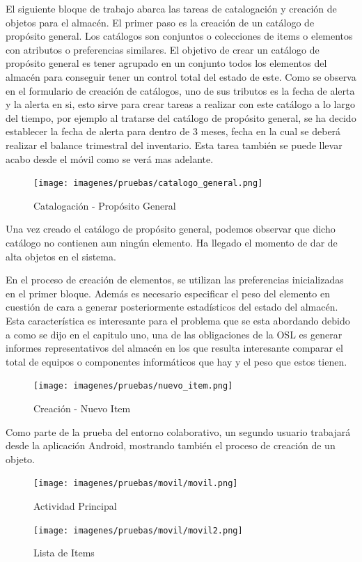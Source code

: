 \documentclass[a4paper,11pt]{book}
\begin{document}
El siguiente bloque de trabajo abarca las tareas de catalogación y creación de objetos para el almacén. El primer paso es la creación de un catálogo de propósito general. Los catálogos son conjuntos o colecciones de items o elementos con atributos o preferencias similares. El objetivo de crear un catálogo de propósito general es tener agrupado en un conjunto todos los elementos del almacén para conseguir tener un control total del estado de este. Como se observa en el formulario de creación de catálogos, uno de sus tributos es la fecha de alerta y la alerta en si, esto sirve para crear tareas a realizar con este catálogo a lo largo del tiempo, por ejemplo al tratarse del catálogo de propósito general, se ha decido establecer la fecha de alerta para dentro de 3 meses, fecha en la cual se deberá realizar el balance trimestral del inventario. Esta tarea también se puede llevar acabo desde el móvil como se verá mas adelante. 

\begin{figure}[H] 
\centering 
\texttt{[image: imagenes/pruebas/catalogo\_general.png]}
\caption{ Catalogación - Propósito General}
\end{figure}

Una vez creado el catálogo de propósito general, podemos observar que dicho catálogo no contienen aun ningún elemento. Ha llegado el momento de dar de alta objetos en el sistema. 

En el proceso de creación de elementos, se utilizan las preferencias inicializadas en el primer bloque. Además es necesario especificar el peso del elemento en cuestión de cara a generar posteriormente estadísticos del estado del almacén. Esta característica es interesante para el problema que se esta abordando debido a como se dijo en el capitulo uno, una de las obligaciones de la OSL es generar informes representativos del almacén en los que resulta interesante comparar el total de equipos o componentes informáticos que hay y el peso que estos tienen. 
\begin{figure}[H] 
\centering 
\texttt{[image: imagenes/pruebas/nuevo\_item.png]}
\caption{ Creación - Nuevo Item}
\end{figure}

Como parte de la prueba del entorno colaborativo, un segundo usuario trabajará desde la aplicación Android, mostrando también el proceso de creación de un objeto. 



\begin{figure}[H]
  \texttt{[image: imagenes/pruebas/movil/movil.png]}
  \caption{Actividad Principal}
\endminipage\hfill
{}
  \texttt{[image: imagenes/pruebas/movil/movil2.png]}
  \caption{Lista de Items}
\endminipage\hfill
\end{figure}
\end{document}
